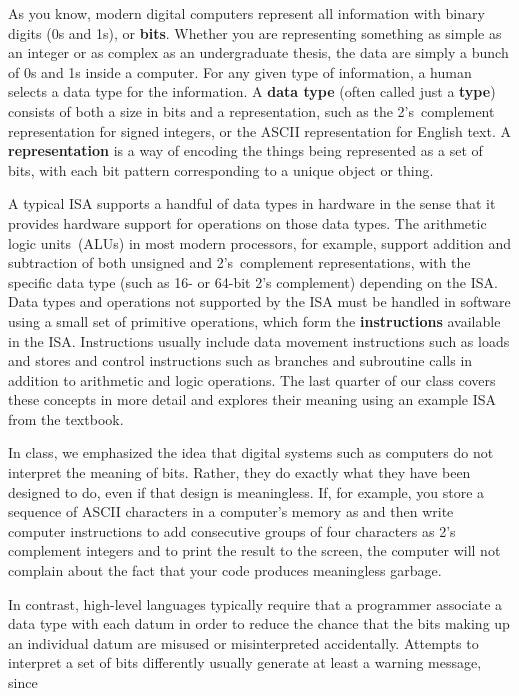 As you know, modern digital computers represent all information with
binary digits (0s and 1s), or {\bf bits}.  Whether you are representing 
something as simple as an integer or as complex as an undergraduate 
thesis, the data are simply a bunch of 0s and 1s inside a computer.  
%
For any given type of information, a human selects a data type for the
information.  A {\bf data type} (often called just a {\bf type})
consists of both a size in bits and a representation, such as the
2's~complement representation for signed integers, or the ASCII
representation for English text.  A {\bf representation} is a way of
encoding the things being represented as a set of bits, with each bit
pattern corresponding to a unique object or thing.

A typical ISA supports a handful of
data types in hardware in the sense that it provides hardware 
support for operations on those data types.
%
The arithmetic logic units~(ALUs) in most modern processors,
for example, support addition
and subtraction of both unsigned and 2's~complement representations, with
the specific data type (such as 16- or 64-bit 2's complement)
depending on the ISA.
%
Data types and operations not supported by the ISA must be handled in
software using a small set of primitive operations, which form the
{\bf instructions} available in the ISA.  Instructions usually
include data movement instructions such as loads and stores
and control instructions such as branches and subroutine calls in
addition to arithmetic and logic operations.  
%
The last quarter of our class covers these concepts in more detail
and explores their meaning using an example ISA from the textbook.

In class, we emphasized the idea that digital systems such as computers
do not interpret the meaning of bits.  Rather, they do exactly what
they have been designed to do, even if that design is meaningless.
%
If, for example, you store
a sequence of ASCII characters 
in a computer's memory as 
and
then write computer instructions to add consecutive groups of four characters
as 2's complement integers and to print the result to the screen, the
computer will not complain about the fact that your code produces
meaningless garbage.  

In contrast, high-level languages typically require that a programmer
associate a data type with each datum in order to reduce the chance 
that the bits 
making up an individual datum are misused or misinterpreted accidentally.  
%
Attempts to interpret a set of bits differently usually generate at least
a warning message, since\linebreak

